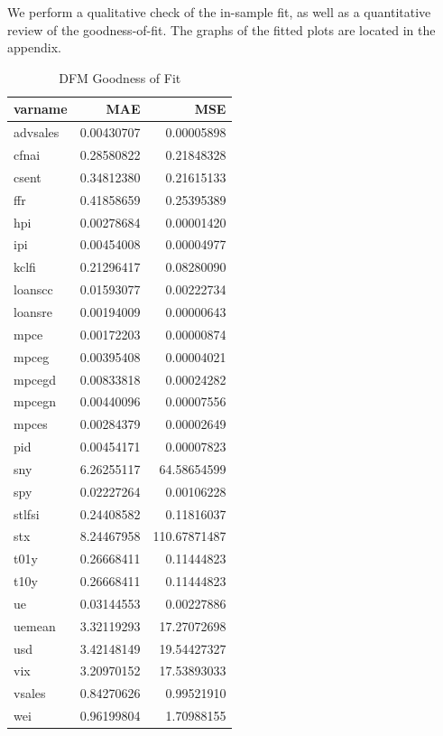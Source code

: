 \documentclass[11pt, letterpaper]{article}\usepackage[]{graphicx}\usepackage[]{color}
\begin{document}
We perform a qualitative check of the in-sample fit, as well as a quantitative review of the goodness-of-fit. The graphs of the fitted plots are located in the appendix.
\begin{table}[H]
\centering
\begingroup\footnotesize
\begin{tabular}{lrr}
  \hline
varname & MAE & MSE \\ 
  \hline
advsales & 0.00430707 & 0.00005898 \\ 
  cfnai & 0.28580822 & 0.21848328 \\ 
  csent & 0.34812380 & 0.21615133 \\ 
  ffr & 0.41858659 & 0.25395389 \\ 
  hpi & 0.00278684 & 0.00001420 \\ 
  ipi & 0.00454008 & 0.00004977 \\ 
  kclfi & 0.21296417 & 0.08280090 \\ 
  loanscc & 0.01593077 & 0.00222734 \\ 
  loansre & 0.00194009 & 0.00000643 \\ 
  mpce & 0.00172203 & 0.00000874 \\ 
  mpceg & 0.00395408 & 0.00004021 \\ 
  mpcegd & 0.00833818 & 0.00024282 \\ 
  mpcegn & 0.00440096 & 0.00007556 \\ 
  mpces & 0.00284379 & 0.00002649 \\ 
  pid & 0.00454171 & 0.00007823 \\ 
  sny & 6.26255117 & 64.58654599 \\ 
  spy & 0.02227264 & 0.00106228 \\ 
  stlfsi & 0.24408582 & 0.11816037 \\ 
  stx & 8.24467958 & 110.67871487 \\ 
  t01y & 0.26668411 & 0.11444823 \\ 
  t10y & 0.26668411 & 0.11444823 \\ 
  ue & 0.03144553 & 0.00227886 \\ 
  uemean & 3.32119293 & 17.27072698 \\ 
  usd & 3.42148149 & 19.54427327 \\ 
  vix & 3.20970152 & 17.53893033 \\ 
  vsales & 0.84270626 & 0.99521910 \\ 
  wei & 0.96199804 & 1.70988155 \\ 
   \hline
\end{tabular}
\endgroup
\caption{DFM Goodness of Fit} 
\end{table}
\end{document}
